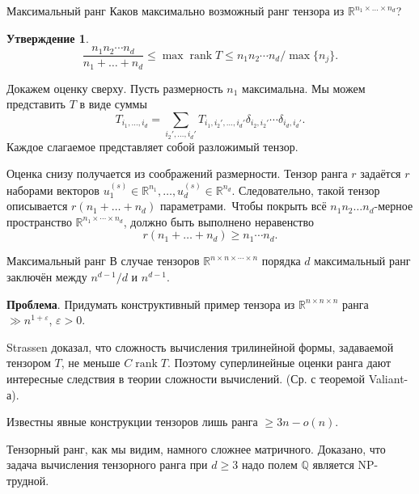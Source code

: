 \documentclass[handout]{beamer}
\renewcommand\le{\leqslant}
\renewcommand\ge{\geqslant}
\newcommand\R{\mathbb R}
\newcommand\eps{\varepsilon}
\newtheorem*{statement}{Утверждение}
\DeclareMathOperator{\rank}{rank}
\begin{document}
\begin{frame}{Максимальный ранг}
    Каков максимально возможный ранг тензора из $\R^{n_1\times \ldots \times n_d}$?
    \pause
    \begin{statement}
        $$
        \frac{n_1n_2\cdots n_d}{n_1+\ldots+n_d} \le \max\rank T \le n_1n_2\cdots n_d/\max\{n_j\}.
        $$
    \end{statement}
    \pause
    Докажем оценку сверху. Пусть размерность $n_1$ максимальна. Мы можем представить $T$ в
    виде суммы
    $$
    T_{i_1,\ldots,i_d} =
    \sum_{i_2',\ldots,i_d'}T_{i_1,i_2',\ldots,i_d'}\delta_{i_2,i_2'}\cdots\delta_{i_d,i_d'}.
    $$
    Каждое слагаемое представляет собой разложимый тензор.
    \pause

    Оценка снизу получается из соображений размерности. Тензор ранга $r$
    задаётся $r$ наборами векторов
    $u^{(s)}_1\in\R^{n_1},\ldots,u^{(s)}_d\in\R^{n_d}$. Следовательно, такой
    тензор описывается $r(n_1+\ldots+n_d)$ параметрами.\pause~Чтобы покрыть всё
    $n_1n_2\ldots n_d$-мерное пространство $\R^{n_1\times\cdots\times n_d}$,
    должно быть выполнено неравенство
    $$
    r(n_1+\ldots+n_d) \ge n_1\cdots n_d.
    $$
\end{frame}

\begin{frame}{Максимальный ранг}
    В случае тензоров $\R^{n\times n\times \cdots\times n}$ порядка $d$
    максимальный ранг заключён между $n^{d-1}/d$ и $n^{d-1}$.
    \pause\vspace{5pt}

    \textbf{Проблема}. Придумать конструктивный пример тензора из $\R^{n\times
    n\times n}$ ранга $\gg n^{1+\eps}$, $\eps>0$.

    Strassen доказал, что сложность вычисления трилинейной формы, задаваемой
    тензором $T$, не меньше $C\rank T$. Поэтому суперлинейные оценки ранга дают
    интересные следствия в теории сложности вычислений. (Ср. с теоремой
    Valiant-а).
    \pause

    Известны явные конструкции тензоров лишь ранга $\ge 3n-o(n)$.
    \pause\vspace{5pt}

    Тензорный ранг, как мы видим, намного сложнее матричного. Доказано, что
    задача вычисления тензорного ранга при $d\ge 3$ надо полем $\mathbb
    Q$ является NP-трудной.
\end{frame}
\end{document}
